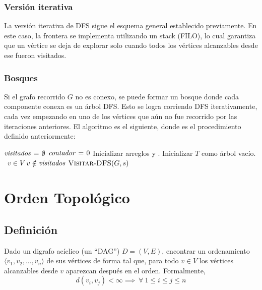 \documentclass[a4paper]{report}
\newcommand{\Each}{\kw{each}\ }
\begin{document}
\subsubsection{Versión iterativa}

La versión iterativa de DFS sigue el esquema general \hyperref[recorridos]{establecido previamente}. En este caso, la frontera se implementa utilizando un stack (FILO), lo cual garantiza que un vértice se deja de explorar solo cuando todos los vértices alcanzables desde ese fueron visitados.

\subsubsection{Bosques}

Si el grafo recorrido $G$ no es conexo, se puede formar un bosque donde cada componente conexa es un árbol DFS. Esto se logra corriendo DFS iterativamente, cada vez empezando en uno de los vértices que aún no fue recorrido por las iteraciones anteriores. El algoritmo es el siguiente, donde  es el procedimiento definido anteriormente:

\begin{codebox}
    \li $\id{visitados} \gets \emptyset$
    \li $\id{contador} \gets 0$
    \li Inicializar arreglos  y .
    \li Inicializar $T$ como árbol vacío.
    \li \For \Each $v \in V$ \Do
    \li \If $v \notin \id{visitados}$ \Then
    \li $\textnormal{\scshape Visitar-DFS}(G, s)$
    \End
    \End
\end{codebox}

\section{Orden Topológico}
\label{orden-topologico}

\subsection{Definición}

\begin{problema}
    Dado un digrafo acíclico (un ``DAG'') $D = (V, E)$, encontrar un ordenamiento $\langle v_1, v_2, ..., v_n \rangle$ de sus vértices de forma tal que, para todo $v \in V$ los vértices alcanzables desde $v$ aparezcan después en el orden. Formalmente,
    $$d(v_i, v_j) < \infty \implies\ \forall\ 1 \leq i \leq j \leq n$$
\end{problema}
\end{document}
